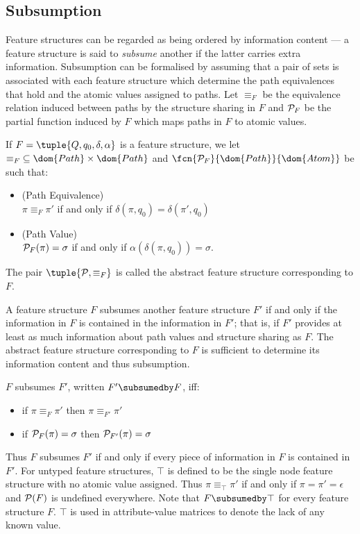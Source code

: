 \documentclass[12pt]{report}
\begin{document}
\subsection{Subsumption}
\label{untsub}

Feature structures can be regarded as being ordered by information
content --- a feature structure is said
to {\em subsume} another if the latter carries extra information.
Subsumption can be formalised by assuming that
a pair of sets is associated with each feature structure
which determine the path equivalences that hold and the
atomic values assigned to paths.  
Let $\equiv_{F}$ be the equivalence relation induced
between paths by the structure sharing in $F$ and ${\cal P}_{F}$ be
the partial function induced by $F$ which maps paths in $F$ to atomic
values. 
%
\begin{definition}
If $F = \tuple{Q,q_{0},\delta,\alpha}$ is a feature structure, we let
$\equiv_{F} \; \subseteq \dom{Path} \times \dom{Path}$ and
$\fcn{{\cal P}_{F}}{\dom{Path}}{\dom{Atom}}$ be such that:
\begin{itemize}
\item
(Path Equivalence) \\
$\pi \equiv_{F} \pi'$ 
if and only if $\delta(\pi,q_{0}) = \delta(\pi',q_{0})$
\item
(Path Value) \\
${\cal P}_{F}(\pi) = \sigma$ 
if and only if
$\alpha(\delta(\pi,q_{0})) = \sigma$.
\end{itemize}
The pair $\tuple{{\cal P},\equiv_{F}}$ is called the abstract
feature structure corresponding to $F$.
\end{definition}
%

A feature structure $F$ subsumes another feature
structure $F'$ if and only if the information in $F$ is contained in
the information in $F'$;  that is, if $F'$ provides at least as much
information about path values and structure sharing as $F$.  The
abstract feature structure corresponding to $F$ is sufficient to
determine its information content and thus subsumption.
%
\begin{definition}[Subsumption]
$F$ subsumes $F'$, written $F' \subsumedby F$, iff:
\begin{itemize}
\item if $\pi \equiv_{F} \pi'$ then $\pi \equiv_{F'} \pi'$
\item if ${\cal P}_{F}(\pi) = \sigma$ then ${\cal P}_{F'}(\pi) = \sigma$
\end{itemize}
\end{definition}
%
Thus $F$ subsumes $F'$ if and only if every piece of information in
$F$ is contained in $F'$.   For untyped feature structures,
$\top$ is defined to be the single node feature structure with no atomic
value assigned.  Thus $\pi \equiv_{\top} \pi'$ if and only if $\pi =
\pi' = \epsilon$ and ${\cal P}(F)$ is undefined everywhere.  Note that
$F \subsumedby \top $ for every feature structure $F$.  $\top$ is used
in attribute-value matrices to denote the lack of
any known value.
\end{document}
